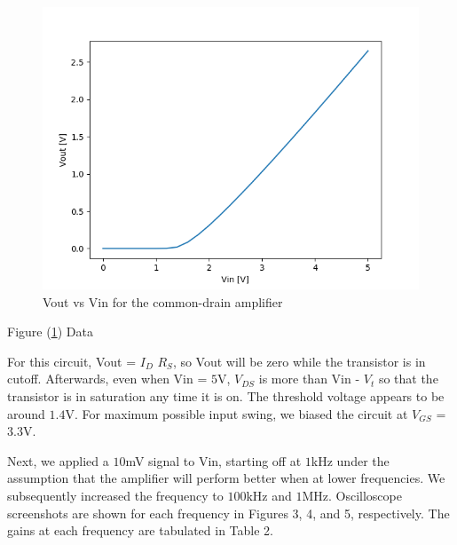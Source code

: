\begin{figure}[h!]
	\centering
	\includegraphics[scale=0.75]{./images/part1_vtc.PNG}
	\caption{Vout vs Vin for the common-drain amplifier}
	\label{fig:part1_vtc}
\end{figure}

\FloatBarrier

\begin{table}[h!]
	\centering
	\caption{Figure (\ref{fig:part1_vtc}) Data}
	\label{tab:part1_vtc}
\end{table}

\FloatBarrier

For this circuit, Vout = $I_{D}$ $R_{S}$, so Vout will be zero while the transistor is in cutoff. Afterwards, even when Vin = $5$\si{\volt}, $V_{DS}$ is more than Vin - $V_{t}$ so that the transistor is in saturation any time it is on.
The threshold voltage appears to be around $1.4$\si{\volt}.
For maximum possible input swing, we biased the circuit at $V_{GS}$ = $3.3$\si{\volt}.

Next, we applied a $10$\si{\milli\volt} signal to Vin, starting off at $1$\si{\kilo\hertz} under the assumption that the amplifier will perform better when at lower frequencies.
We subsequently increased the frequency to $100$\si{\kilo\hertz} and $1$\si{\mega\hertz}. Oscilloscope screenshots are shown for each frequency in Figures 3, 4, and 5, respectively.
The gains at each frequency are tabulated in Table 2.


\FloatBarrier

